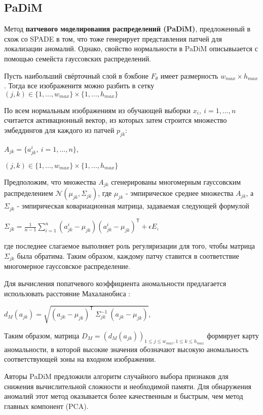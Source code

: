 \documentclass{article}
\begin{document}
\begin{large}
\subsection{PaDiM}

Метод \textbf{патчевого моделирования распределений (PaDiM)}, предложенный в \cite{padim} схож со SPADE в том, что тоже генерирует представления патчей для локализации аномалий. Однако, свойство нормальности в PaDiM описывыается с помощью семейста гауссовских распределений.

Пусть наибольший свёрточный слой в бэкбоне $F_\theta$ имеет размерность $w_{max} \times h_{max}$. Тогда все изображенитя можно разбить в сетку $(j, k) \in \{1,...,w_{max}\} \times \{1,...,h_{max}\}$

По всем нормальным изображениям из обучающей выборки $x_i, \ i=1,...,n$ считается активационный вектор, из которых затем строится множество эмбеддингов для каждого из патчей $p_{jk}$:
\begin{center}
	$A_{jk} = \{a^i_{jk}, \ i=1,...,n\}$,
	
	$(j, k) \in \{1,...,w_{max}\} \times \{1,...,h_{max}\}$
\end{center}
Предположим, что множества $A_{jk}$ сгенерированы многомерным гауссовским распределением $\mathcal{N}(\mu_{jk}, \Sigma_{jk})$, где $\mu_{jk}$ - эмпирическое среднее множества $A_{jk}$, а $\Sigma_{jk}$ - эмпирическая ковариационная матрица, задаваемая следующей формулой
\begin{center}
	$\Sigma_{jk} = \frac{1}{n - 1} \sum\limits_{i=1}^{n} (a^i_{jk} - \mu_{jk})(a^i_{jk} - \mu_{jk})^{\mathsf{T}} + \epsilon E$,
\end{center}
где последнее слагаемое выполняет роль регуляризации для того, чтобы матрица $\Sigma_{jk}$ была обратима. Таким образом, каждому патчу ставится в соответствие многомерное гауссовское распределение.

Для вычисления попатчевого коэффициента аномальности предлагается использовать расстояние Махаланобиса \cite{Mahalanobis}:
\begin{center}
	$d_M(a_{jk}) = \sqrt{(a_{jk} - \mu_{jk})^{\mathsf{T}} \ \Sigma_{jk}^{-1} \ (a_{jk} - \mu_{jk})}$,
\end{center}
Таким образом, матрица $D_M = (d_M(a_{jk}))_{1\le j \le w_{max}, 1\le k \le h_{max}}$ формирует карту аномальности, в которой высокие значения обозначают высокую аномальность соответствующей зоны на входном изображении.

Авторы PaDiM предложили алгоритм случайного выбора признаков для снижения вычислительной сложности и необходимой памяти. Для обнаружения аномалий этот метод оказывается более качественным и быстрым, чем метод главных компонент (PCA).


\end{large}
\end{document}
